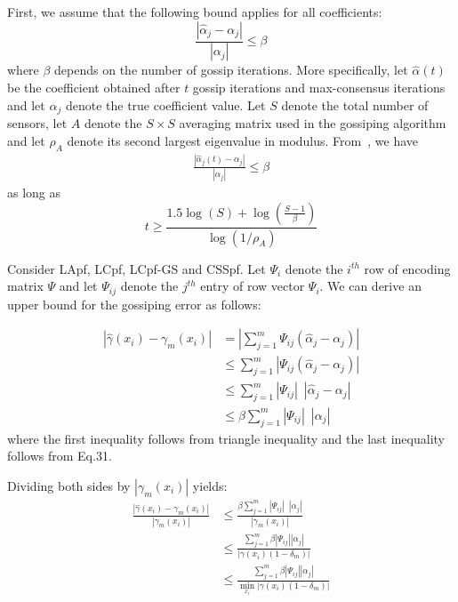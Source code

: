 \documentclass[10pt,letterpaper,final]{article}
\begin{document}
First, we assume that the following bound applies for all coefficients:
\begin{equation}
\frac{|\hat{\alpha}_j-\alpha_j|}{|\alpha_j|}\leq \beta
\end{equation}
where $\beta$ depends on the number of gossip iterations. More specifically, let $\hat{\alpha}(t)$ be the coefficient obtained after $t$ gossip iterations and max-consensus iterations and let $\alpha_j$ denote the true coefficient value. Let $S$ denote the total number of sensors, let $A$ denote the $S\times S$ averaging matrix used in the gossiping algorithm and let $\rho_A$ denote its second largest eigenvalue in modulus. From~\cite{Syamantak2015}, we have
\begin{align}
\frac{|\hat{\alpha}_j(t)-\alpha_j|}{|\alpha_j|}\leq \beta
\end{align}
as long as
\begin{equation}
t\geq \frac{1.5\log(S)+\log(\frac{S-1}{\beta})}{\log(1/\rho_A)}
\label{eqn:minimum_NGossip}
\end{equation}

Consider LApf, LCpf, LCpf-GS and CSSpf. Let $\Psi_i$ denote the $i^{th}$ row of encoding matrix $\Psi$ and let $\Psi_{ij}$ denote the $j^{th}$ entry of row vector $\Psi_i$. We can derive an upper bound for the gossiping error as follows: 

\begin{align}
|\hat{\gamma}(x_i)-\gamma_m(x_i)| &= \left\vert\sum_{j=1}^m \Psi_{ij}(\hat{\alpha}_j-\alpha_j)\right\vert \nonumber \\
&\leq \sum_{j=1}^m\left\vert \Psi_{ij}(\hat{\alpha}_j-\alpha_j)\right\vert\nonumber  \\
&\leq \sum_{j=1}^m\left\vert \Psi_{ij}\right\vert \phantom{1} \left\vert\hat{\alpha}_j-\alpha_j\right\vert \nonumber \\
&\leq \beta\sum_{j=1}^m\left\vert \Psi_{ij}\right\vert \phantom{1} \left\vert\alpha_j\right\vert
\end{align}
where the first inequality follows from triangle inequality and the last inequality follows from Eq.31. 

Dividing both sides by $|\gamma_m(x_i)|$ yields:
\begin{align}
\frac{|\hat{\gamma}(x_i)-\gamma_m(x_i)|}{|\gamma_m(x_i)|} &\leq  \frac{\beta \sum_{j=1}^m\left\vert \Psi_{ij}\right\vert \phantom{1} \left\vert\alpha_j\right\vert}{|\gamma_m(x_i)|} \nonumber\\
&\leq \frac{\sum_{j=1}^m\beta \left\vert \Psi_{ij}\right\vert \left\vert\alpha_j\right\vert}{|\gamma(x_i)(1-\delta_m)|} \nonumber \\
&\leq \frac{\sum_{j=1}^m\beta \left\vert \Psi_{ij}\right\vert \left\vert\alpha_j\right\vert}{\min_{x_i}|\gamma(x_i)(1-\delta_m)|} 
\label{eqn:gossiping_error}
\end{align}
\end{document}
